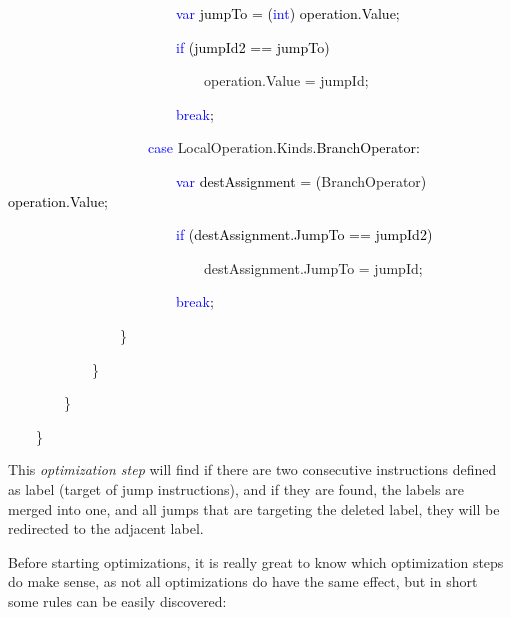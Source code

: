 \documentclass[letterpaper]{article}
\begin{document}
\textcolor{black}{\ \ \ \ \ \ \ \ \ \ \ \ \ \ \ \ \ \ \ \ \ \ \ \ }\textcolor{blue}{var}\textcolor{black}{ jumpTo =
(}\textcolor{blue}{int}\textcolor{black}{) operation.Value;}

\textcolor{black}{\ \ \ \ \ \ \ \ \ \ \ \ \ \ \ \ \ \ \ \ \ \ \ \ }\textcolor{blue}{if}\textcolor{black}{ (jumpId2 ==
jumpTo)}

{\color{black}
\ \ \ \ \ \ \ \ \ \ \ \ \ \ \ \ \ \ \ \ \ \ \ \ \ \ \ \ operation.Value = jumpId;}

\textcolor{black}{\ \ \ \ \ \ \ \ \ \ \ \ \ \ \ \ \ \ \ \ \ \ \ \ }\textcolor{blue}{break}\textcolor{black}{;}

\textcolor{black}{\ \ \ \ \ \ \ \ \ \ \ \ \ \ \ \ \ \ \ \ }\textcolor{blue}{case}\textcolor{black}{
}\textcolor[rgb]{0.16862746,0.5686275,0.6862745}{LocalOperation}\textcolor{black}{.}\textcolor[rgb]{0.16862746,0.5686275,0.6862745}{Kinds}\textcolor{black}{.BranchOperator:}

\textcolor{black}{\ \ \ \ \ \ \ \ \ \ \ \ \ \ \ \ \ \ \ \ \ \ \ \ }\textcolor{blue}{var}\textcolor{black}{
destAssignment = (}\textcolor[rgb]{0.16862746,0.5686275,0.6862745}{BranchOperator}\textcolor{black}{) operation.Value;}

\textcolor{black}{\ \ \ \ \ \ \ \ \ \ \ \ \ \ \ \ \ \ \ \ \ \ \ \ }\textcolor{blue}{if}\textcolor{black}{
(destAssignment.JumpTo == jumpId2)}

{\color{black}
\ \ \ \ \ \ \ \ \ \ \ \ \ \ \ \ \ \ \ \ \ \ \ \ \ \ \ \ destAssignment.JumpTo = jumpId;}

\textcolor{black}{\ \ \ \ \ \ \ \ \ \ \ \ \ \ \ \ \ \ \ \ \ \ \ \ }\textcolor{blue}{break}\textcolor{black}{;}

{\color{black}
\ \ \ \ \ \ \ \ \ \ \ \ \ \ \ \ \}}

{\color{black}
\ \ \ \ \ \ \ \ \ \ \ \ \}}

{\color{black}
\ \ \ \ \ \ \ \ \}}

{\color{black}
\ \ \ \ \}}

This \textit{optimization step} will find if there are two consecutive instructions defined as label (target of jump
instructions), and if they are found, the labels are merged into one, and all jumps that are targeting the deleted
label, they will be redirected to the adjacent label.


\bigskip

Before starting optimizations, it is really great to know which optimization steps do make sense, as not all
optimizations do have the same effect, but in short some rules can be easily discovered:
\end{document}
